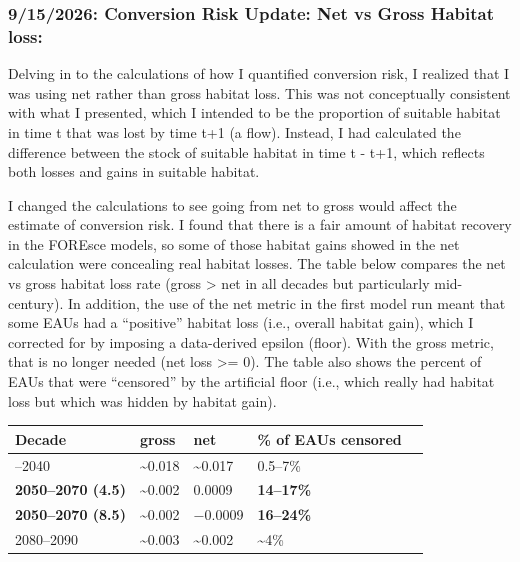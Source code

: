 \documentclass[
  letterpaper,
  DIV=11,
  numbers=noendperiod]{scrartcl}
\newcounter{none} %
\begin{document}
\subsubsection{9/15/2026: Conversion Risk Update: Net vs Gross Habitat
loss:}\label{conversion-risk-update-net-vs-gross-habitat-loss}

Delving in to the calculations of how I quantified conversion risk, I
realized that I was using net rather than gross habitat loss. This was
not conceptually consistent with what I presented, which I intended to
be the proportion of suitable habitat in time t that was lost by time
t+1 (a flow). Instead, I had calculated the difference between the stock
of suitable habitat in time t - t+1, which reflects both losses and
gains in suitable habitat.

I changed the calculations to see going from net to gross would affect
the estimate of conversion risk. I found that there is a fair amount of
habitat recovery in the FOREsce models, so some of those habitat gains
showed in the net calculation were concealing real habitat losses. The
table below compares the net vs gross habitat loss rate (gross
\textgreater{} net in all decades but particularly mid-century). In
addition, the use of the net metric in the first model run meant that
some EAUs had a ``positive'' habitat loss (i.e., overall habitat gain),
which I corrected for by imposing a data-derived epsilon (floor). With
the gross metric, that is no longer needed (net loss \textgreater= 0).
The table also shows the percent of EAUs that were ``censored'' by the
artificial floor (i.e., which really had habitat loss but which was
hidden by habitat gain).

{\def\LTcaptype{none} %
\begin{longtable}[]{@{}lllll@{}}
\toprule\noalign{}
Decade & gross & net & \% of EAUs censored & \\
\midrule\noalign{}
\endhead
\bottomrule\noalign{}
\endlastfoot
2020--2040 & \textasciitilde0.018 & \textasciitilde0.017 & 0.5--7\% & \\
\textbf{2050--2070 (4.5)} & \textasciitilde0.002 & 0.0009 &
\textbf{14--17\%} & \\
\textbf{2050--2070 (8.5)} & \textasciitilde0.002 & −0.0009 &
\textbf{16--24\%} & \\
2080--2090 & \textasciitilde0.003 & \textasciitilde0.002 &
\textasciitilde4\% & \\
\end{longtable}
}
\end{document}
